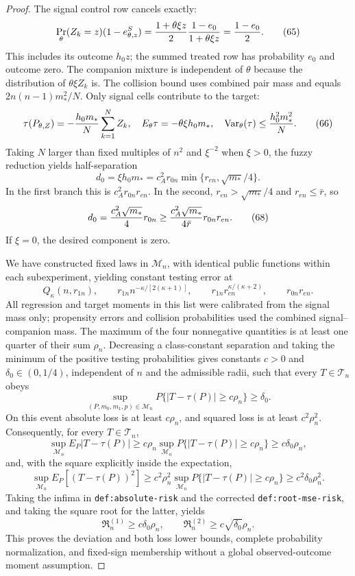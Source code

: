 \documentclass{article}
\begin{document}
\begin{proof}
The signal control row cancels exactly:
\[
\Pr_\theta(Z_k=z)(1-e^S_{\theta,z})
={1+\theta\xi z\over2}{1-e_0\over1+\theta\xi z}
={1-e_0\over2}.                                           \tag{65}
\]
This includes its outcome \(h_0z\); the summed treated row has probability
\(e_0\) and outcome zero.  The companion mixture is independent of \(\theta\)
because the distribution of \(\theta\xi Z_k\) is.  The collision bound uses
combined pair mass and equals \(2n(n-1)m_*^2/N\).  Only signal cells contribute
to the target:
\[
\tau(P_{\theta,Z})=-{h_0m_*\over N}\sum_{k=1}^NZ_k,\quad
E_\theta\tau=-\theta\xi h_0m_*,\quad
\operatorname{Var}_\theta(\tau)\leq{h_0^2m_*^2\over N}.    \tag{66}
\]
Taking \(N\) larger than fixed multiples of \(n^2\) and \(\xi^{-2}\) when
\(\xi>0\), the fuzzy reduction yields half-separation
\[
d_0=\xi h_0m_*
=c_A^2r_{0n}\min\{r_{en},\sqrt{m_*}/4\}.                  \tag{67}
\]
In the first branch this is \(c_A^2r_{0n}r_{en}\).  In the second,
\(r_{en}>\sqrt{m_*}/4\) and \(r_{en}\leq\bar r\), so
\[
d_0={c_A^2\sqrt{m_*}\over4}r_{0n}
\geq{c_A^2\sqrt{m_*}\over4\bar r}r_{0n}r_{en}.            \tag{68}
\]
If \(\xi=0\), the desired component is zero.

We have constructed fixed laws in \(\mathcal M_n\), with identical public
functions within each subexperiment, yielding constant testing error at
\[
Q_\kappa(n,r_{1n}),\quad\quad
r_{1n}n^{-\kappa/[2(\kappa+1)]},\quad\quad
r_{1n}r_{en}^{\kappa/(\kappa+2)},\quad\quad r_{0n}r_{en}.       \tag{69}
\]
All regression and target moments in this list were calibrated from the signal
mass only; propensity errors and collision probabilities used the combined
signal--companion mass.  The maximum of the four nonnegative quantities is at
least one quarter of their sum \(\rho_n\).  Decreasing a class-constant
separation and taking the minimum of the positive testing probabilities gives
constants \(c>0\) and \(\delta_0\in(0,1/4)\), independent of \(n\) and the
admissible radii, such that every \(T\in\mathcal T_n\) obeys
\[
\sup_{(P,m_0,m_1,p)\in\mathcal M_n}
P\{|T-\tau(P)|\geq c\rho_n\}\geq\delta_0.                 \tag{70}
\]
On this event absolute loss is at least \(c\rho_n\), and squared loss is at
least \(c^2\rho_n^2\).  Consequently, for every \(T\in\mathcal T_n\),
\[
\sup_{\mathcal M_n}E_P|T-\tau(P)|
\geq c\rho_n\sup_{\mathcal M_n}
P\{|T-\tau(P)|\geq c\rho_n\}
\geq c\delta_0\rho_n,
\]
and, with the square explicitly inside the expectation,
\[
\sup_{\mathcal M_n}E_P\!\left[(T-\tau(P))^2\right]
\geq c^2\rho_n^2\sup_{\mathcal M_n}
P\{|T-\tau(P)|\geq c\rho_n\}
\geq c^2\delta_0\rho_n^2.
\]
Taking the infima in \texttt{def:absolute-risk} and the corrected
\texttt{def:root-mse-risk}, and taking the square root for the latter, yields
\[
\mathfrak R_n^{(1)}\geq c\delta_0\rho_n,
\quad\quad
\mathfrak R_n^{(2)}\geq c\sqrt{\delta_0}\rho_n.
\]
This proves the deviation and both loss lower bounds, complete probability
normalization, and fixed-sign membership without a global observed-outcome
moment assumption.
\end{proof}
\end{document}
